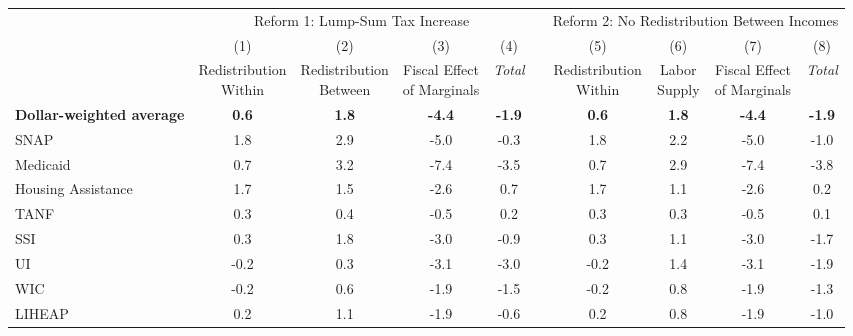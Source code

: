 \begin{tabular*}{1.38\textwidth}{@{\extracolsep{\fill}}lccccccccc}
  \toprule
  \addlinespace
                     & \multicolumn{4}{c}{Reform 1: Lump-Sum Tax Increase}                                  & \multicolumn{1}{l}{} & \multicolumn{4}{c}{Reform 2: No  Redistribution Between Incomes}        \\
\multicolumn{1}{c}{} & (1)                   & (2)                    & (3)                      & (4)            &                      & (5)                   & (6)          & (7)                      & (8)            \\
                     & \shortstack{Redistribution \\ Within} &
\shortstack{Redistribution \\ Between} & \shortstack{Fiscal Effect \\ of
  Marginals} & \textit{Total} &                      &
\shortstack{Redistribution \\ Within} & \shortstack{Labor \\ Supply} &
\shortstack{Fiscal Effect \\ of Marginals} & \textit{Total} \\
\cline{2-5} \cline{7-10}
\textbf{Dollar-weighted average} & \textbf{0.6}        & \textbf{1.8}         & \textbf{-4.4}             & \textbf{-1.9}  &                      & \textbf{0.6}        & \textbf{1.8} & \textbf{-4.4}             & \textbf{-1.9}  \\

\addlinespace

SNAP                 & 1.8        & 2.9         & -5.0             & -0.3  &                      & 1.8        & 2.2 & -5.0             & -1.0  \\
Medicaid             & 0.7        & 3.2         & -7.4             & -3.5  &                      & 0.7        & 2.9 & -7.4             & -3.8  \\
Housing Assistance   & 1.7        & 1.5         & -2.6             & 0.7  &                      & 1.7        & 1.1 & -2.6             & 0.2  \\
TANF                 & 0.3        & 0.4         & -0.5             & 0.2  &                      & 0.3        & 0.3 & -0.5             & 0.1  \\
SSI                  & 0.3        & 1.8         & -3.0             & -0.9  &                      & 0.3        & 1.1 & -3.0             & -1.7  \\
UI                   & -0.2        & 0.3         & -3.1             & -3.0  &                      & -0.2        & 1.4 & -3.1             & -1.9  \\
WIC                  & -0.2        & 0.6         & -1.9             & -1.5  &                      & -0.2        & 0.8 & -1.9             & -1.3  \\
LIHEAP               & 0.2
& 1.1         & -1.9
& -0.6  &                      & 0.2
& 0.8 & -1.9             & -1.0
\\

\bottomrule 
\end{tabular*}
